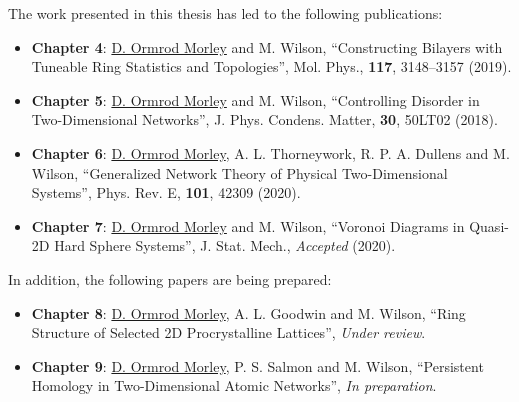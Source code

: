 The work presented in this thesis has led to the following publications:

\begin{itemize}

	\item \textbf{Chapter 4}: \underline{D. Ormrod Morley} and M. Wilson, ``Constructing Bilayers with Tuneable Ring Statistics and Topologies'', Mol. Phys., \textbf{117}, 3148–3157 (2019).

	\item \textbf{Chapter 5}: \underline{D. Ormrod Morley} and M. Wilson, ``Controlling Disorder in Two\--Dimensional Networks'', J. Phys. Condens. Matter, \textbf{30}, 50LT02 (2018).
	
	\item \textbf{Chapter 6}: \underline{D. Ormrod Morley}, A. L. Thorneywork, R. P. A. Dullens and M. Wilson, ``Generalized Network Theory of Physical Two\--Dimensional Systems'', Phys. Rev. E, \textbf{101}, 42309 (2020).
	
	\item \textbf{Chapter 7}: \underline{D. Ormrod Morley} and M. Wilson, ``Voronoi Diagrams in Quasi\--2D Hard Sphere Systems'', J. Stat. Mech., \textit{Accepted} (2020).
	
\end{itemize}

\noindent In addition, the following papers are being prepared: 

\begin{itemize}
	
	\item \textbf{Chapter 8}: \underline{D. Ormrod Morley}, A. L. Goodwin and M. Wilson, ``Ring Structure of Selected 2D Procrystalline Lattices'', \textit{Under review}.
	
	\item \textbf{Chapter 9}: \underline{D. Ormrod Morley}, P. S. Salmon and M. Wilson, ``Persistent Homology in Two\--Dimensional Atomic Networks'', \textit{In preparation}.
	
\end{itemize}